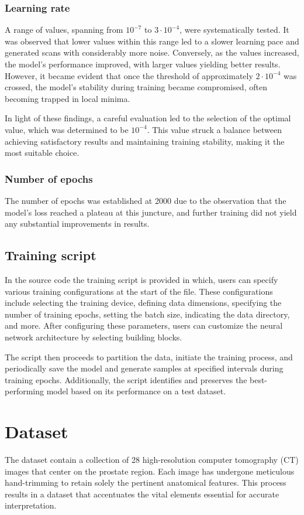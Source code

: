 \documentclass[11pt,a4paper]{report}
\begin{document}
\subsubsection{Learning rate}
A range of values, spanning from $10^{-7}$ to $3\cdot10^{-4}$, were systematically tested. It was observed that lower values within this range led to a slower learning pace and generated scans with considerably more noise. Conversely, as the values increased, the model's performance improved, with larger values yielding better results. However, it became evident that once the threshold of approximately $2\cdot10^{-4}$ was crossed, the model's stability during training became compromised, often becoming trapped in local minima.

In light of these findings, a careful evaluation led to the selection of the optimal value, which was determined to be $10^{-4}$. This value struck a balance between achieving satisfactory results and maintaining training stability, making it the most suitable choice.
\subsubsection{Number of epochs}
The number of epochs was established at 2000 due to the observation that the model's loss reached a plateau at this juncture, and further training did not yield any substantial improvements in results.

\subsection{Training script}
In the source code the training script is provided in which, users can specify various training configurations at the start of the file. These configurations include selecting the training device, defining data dimensions, specifying the number of training epochs, setting the batch size, indicating the data directory, and more. After configuring these parameters, users can customize the neural network architecture by selecting building blocks.

The script then proceeds to partition the data, initiate the training process, and periodically save the model and generate samples at specified intervals during training epochs. Additionally, the script identifies and preserves the best-performing model based on its performance on a test dataset.

\section{Dataset}
The dataset contain a collection of 28 high-resolution computer tomography (CT) images that center on the prostate region. Each image has undergone meticulous hand-trimming to retain solely the pertinent anatomical features. This process results in a dataset that accentuates the vital elements essential for accurate interpretation.
\end{document}
